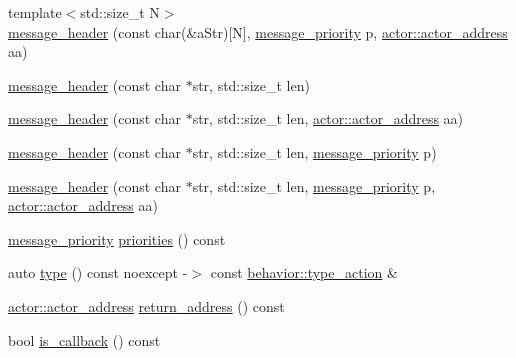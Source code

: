 \begin{DoxyCompactItemize}
\item 
{\footnotesize template$<$std\+::size\+\_\+t N$>$ }\\\hyperlink{classactor__zeta_1_1messaging_1_1message__header_a3054631c5d8fd5ce9a41601c4f0810f0}{message\+\_\+header} (const char(\&a\+Str)\mbox{[}N\mbox{]}, \hyperlink{namespaceactor__zeta_1_1messaging_a1b4c4b3ab625eb033c15da4fbe9c4a89}{message\+\_\+priority} p, \hyperlink{classactor__zeta_1_1actor_1_1actor__address}{actor\+::actor\+\_\+address} aa)
\item 
\hyperlink{classactor__zeta_1_1messaging_1_1message__header_a379d8a6bbc7ffafb59a95297bb2cf726}{message\+\_\+header} (const char $\ast$str, std\+::size\+\_\+t len)
\item 
\hyperlink{classactor__zeta_1_1messaging_1_1message__header_a23da13c8dab225e5513cffc0b1f14d81}{message\+\_\+header} (const char $\ast$str, std\+::size\+\_\+t len, \hyperlink{classactor__zeta_1_1actor_1_1actor__address}{actor\+::actor\+\_\+address} aa)
\item 
\hyperlink{classactor__zeta_1_1messaging_1_1message__header_a1c8d3f0bac1b4e517e51e9dbf6f89235}{message\+\_\+header} (const char $\ast$str, std\+::size\+\_\+t len, \hyperlink{namespaceactor__zeta_1_1messaging_a1b4c4b3ab625eb033c15da4fbe9c4a89}{message\+\_\+priority} p)
\item 
\hyperlink{classactor__zeta_1_1messaging_1_1message__header_ad8161f6856a55dd6ede0fff131b17a6a}{message\+\_\+header} (const char $\ast$str, std\+::size\+\_\+t len, \hyperlink{namespaceactor__zeta_1_1messaging_a1b4c4b3ab625eb033c15da4fbe9c4a89}{message\+\_\+priority} p, \hyperlink{classactor__zeta_1_1actor_1_1actor__address}{actor\+::actor\+\_\+address} aa)
\item 
\hyperlink{namespaceactor__zeta_1_1messaging_a1b4c4b3ab625eb033c15da4fbe9c4a89}{message\+\_\+priority} \hyperlink{classactor__zeta_1_1messaging_1_1message__header_a7082ab0c21345aabd9ecaf5b6e5c2575}{priorities} () const
\item 
auto \hyperlink{classactor__zeta_1_1messaging_1_1message__header_a641b7784a94157d575c1a8099a477cf1}{type} () const noexcept -\/$>$ const \hyperlink{classactor__zeta_1_1behavior_1_1type__action}{behavior\+::type\+\_\+action} \&
\item 
\hyperlink{classactor__zeta_1_1actor_1_1actor__address}{actor\+::actor\+\_\+address} \hyperlink{classactor__zeta_1_1messaging_1_1message__header_af30d8c985437c398fa16c0d8ad8783a5}{return\+\_\+address} () const
\item 
bool \hyperlink{classactor__zeta_1_1messaging_1_1message__header_a6f4d92ee4e7987ff7525473d91d684d4}{is\+\_\+callback} () const
\end{DoxyCompactItemize}


